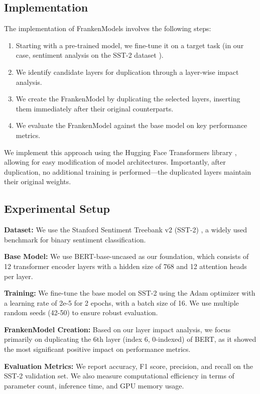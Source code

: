 \documentclass[conference]{IEEEtran}
\begin{document}
\subsection{Implementation}
The implementation of FrankenModels involves the following steps:
\begin{enumerate}
    \item Starting with a pre-trained model, we fine-tune it on a target task (in our case, sentiment analysis on the SST-2 dataset \cite{socher2013recursive}).
    \item We identify candidate layers for duplication through a layer-wise impact analysis.
    \item We create the FrankenModel by duplicating the selected layers, inserting them immediately after their original counterparts.
    \item We evaluate the FrankenModel against the base model on key performance metrics.
\end{enumerate}

We implement this approach using the Hugging Face Transformers library \cite{wolf2020transformers}, allowing for easy modification of model architectures. Importantly, after duplication, no additional training is performed—the duplicated layers maintain their original weights.

\subsection{Experimental Setup}
\textbf{Dataset:} We use the Stanford Sentiment Treebank v2 (SST-2) \cite{socher2013recursive}, a widely used benchmark for binary sentiment classification.

\textbf{Base Model:} We use BERT-base-uncased \cite{devlin2019bert} as our foundation, which consists of 12 transformer encoder layers with a hidden size of 768 and 12 attention heads per layer.

\textbf{Training:} We fine-tune the base model on SST-2 using the Adam optimizer with a learning rate of 2e-5 for 2 epochs, with a batch size of 16. We use multiple random seeds (42-50) to ensure robust evaluation.

\textbf{FrankenModel Creation:} Based on our layer impact analysis, we focus primarily on duplicating the 6th layer (index 6, 0-indexed) of BERT, as it showed the most significant positive impact on performance metrics.

\textbf{Evaluation Metrics:} We report accuracy, F1 score, precision, and recall on the SST-2 validation set. We also measure computational efficiency in terms of parameter count, inference time, and GPU memory usage.
\end{document}

